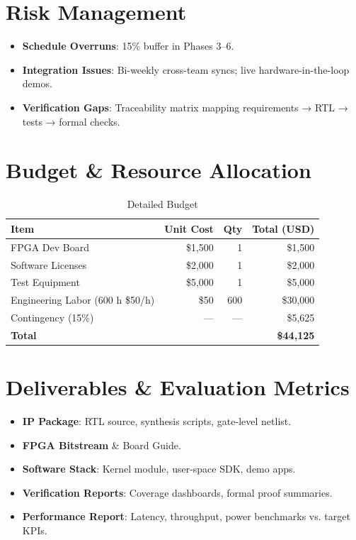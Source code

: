 \documentclass[10pt,twocolumn]{article}
\begin{document}
\section{Risk Management}
\begin{itemize}
  \item \textbf{Schedule Overruns}: 15\% buffer in Phases 3–6.
  \item \textbf{Integration Issues}: Bi-weekly cross-team syncs; live hardware-in-the-loop demos.
  \item \textbf{Verification Gaps}: Traceability matrix mapping requirements → RTL → tests → formal checks.
\end{itemize}

\section{Budget \& Resource Allocation}
\begin{table}[ht]
  \centering
  \caption{Detailed Budget}
  \begin{tabular}{@{}lrrr@{}}
    \toprule
    Item & Unit Cost & Qty & Total (USD) \\
    \midrule
    FPGA Dev Board           & \$1,500 & 1   & \$1,500  \\
    Software Licenses        & \$2,000 & 1   & \$2,000  \\
    Test Equipment           & \$5,000 & 1   & \$5,000  \\
    Engineering Labor (600 h \@ \$50/h) & \$50 & 600 & \$30,000 \\
    Contingency (15\%)       & —       & —   & \$5,625  \\
    \midrule
    \textbf{Total}           &         &     & \textbf{\$44,125} \\
    \bottomrule
  \end{tabular}
  \label{tab:budget}
\end{table}

\section{Deliverables \& Evaluation Metrics}
\begin{itemize}
  \item \textbf{IP Package}: RTL source, synthesis scripts, gate-level netlist.
  \item \textbf{FPGA Bitstream} \& Board Guide.
  \item \textbf{Software Stack}: Kernel module, user-space SDK, demo apps.
  \item \textbf{Verification Reports}: Coverage dashboards, formal proof summaries.
  \item \textbf{Performance Report}: Latency, throughput, power benchmarks vs. target KPIs.
\end{itemize}
\end{document}
